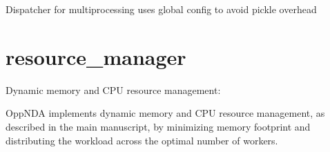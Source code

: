 \documentclass[a4paper,11pt,english,openany,oneside]{sphinxmanual}
\begin{document}

\begin{fulllineitems}
\label{\detokenize{modules/core:core.analysis.execute_plot_job}}
\pysigstartsignatures
\pysiglinewithargsret
{}
{}
{}
\pysigstopsignatures
\sphinxAtStartPar
Dispatcher for multiprocessing \sphinxhyphen{} uses global config to avoid pickle overhead

\end{fulllineitems}


\begin{fulllineitems}
\label{\detokenize{modules/core:core.analysis.main}}
\pysigstartsignatures
\pysiglinewithargsret
{}
{}
{}
\pysigstopsignatures
\end{fulllineitems}



\section{resource\_manager}
\label{\detokenize{modules/core:resource-manager}}
\sphinxAtStartPar
Dynamic memory and CPU resource management:
\label{\detokenize{modules/core:module-core.resource_manager}}

OppNDA implements dynamic memory and CPU resource management, as described in the main manuscript, by minimizing memory footprint and distributing the workload across the optimal number of workers.
\end{document}
